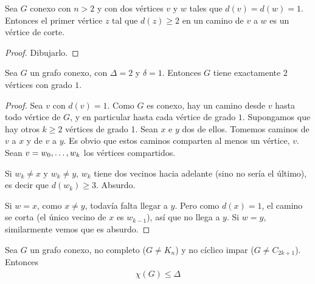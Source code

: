 \begin{lemma}\label{graph_cut_lemma}
Sea $G$ conexo con $n > 2$ y con dos vértices $v$ y $w$ tales que $d(v) = d(w) = 1$. Entonces el primer vértice $z$ tal que $d(z) \ge 2$ en un camino de $v$ a $w$ es un vértice de corte.
\end{lemma}
\begin{proof}
Dibujarlo.
\end{proof}

\begin{lemma}\label{G is chain}
Sea $G$ un grafo conexo, con $\Delta = 2$ y $\delta = 1$. Entonces $G$ tiene exactamente $2$ vértices con grado $1$.
\end{lemma}
\begin{proof}
Sea $v$ con $d(v) = 1$. Como $G$ es conexo, hay un camino desde $v$ hasta todo vértice de $G$, y en particular hasta cada vértice de grado $1$.
Supongamos que hay otros $k \ge 2$ vértices de grado 1. Sean $x$ e $y$ dos de ellos. Tomemos caminos de $v$ a $x$ y de $v$ a $y$. Es obvio que estos caminos comparten al menos un vértice, $v$. Sean $v = w_0, \mathellipsis, w_k$ los vértices compartidos.

Si $w_k \neq x$ y $w_k \neq y$, $w_k$ tiene dos vecinos hacia adelante (sino no sería el último), es decir que $d(w_k) \ge 3$. Absurdo.

Si $w = x$, como $x \neq y$, todavía falta llegar a $y$. Pero como $d(x) = 1$, el camino se corta (el único vecino de $x$ es $w_{k-1}$), así que no llega a $y$. Si $w = y$, similarmente vemos que es absurdo.
\end{proof}

\begin{theorem}
Sea $G$ un grafo conexo, no completo ($G \neq K_n$) y no cíclico impar ($G \neq C_{2k+1}$). Entonces
\begin{align}
    \chi(G) \le \Delta
\end{align}
\end{theorem}

